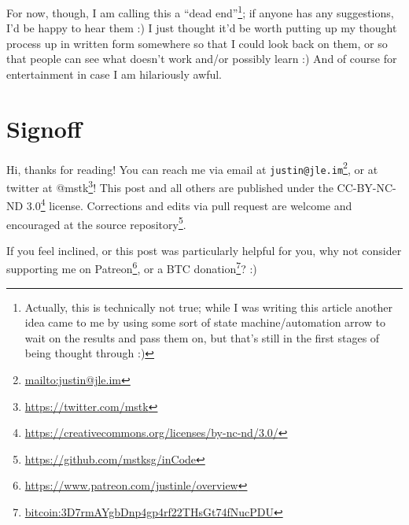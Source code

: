 \documentclass[]{article}
\renewcommand{\href}[2]{#2\footnote{\url{#1}}}
\begin{document}
For now, though, I am calling this a ``dead end''\footnote{Actually, this is
  technically not true; while I was writing this article another idea came to me
  by using some sort of state machine/automation arrow to wait on the results
  and pass them on, but that's still in the first stages of being thought
  through :)}; if anyone has any suggestions, I'd be happy to hear them :) I
just thought it'd be worth putting up my thought process up in written form
somewhere so that I could look back on them, or so that people can see what
doesn't work and/or possibly learn :) And of course for entertainment in case I
am hilariously awful.

\hypertarget{signoff}{%
\section{Signoff}\label{signoff}}

Hi, thanks for reading! You can reach me via email at
\href{mailto:justin@jle.im}{\nolinkurl{justin@jle.im}}, or at twitter at
\href{https://twitter.com/mstk}{@mstk}! This post and all others are published
under the \href{https://creativecommons.org/licenses/by-nc-nd/3.0/}{CC-BY-NC-ND
3.0} license. Corrections and edits via pull request are welcome and encouraged
at \href{https://github.com/mstksg/inCode}{the source repository}.

If you feel inclined, or this post was particularly helpful for you, why not
consider \href{https://www.patreon.com/justinle/overview}{supporting me on
Patreon}, or a \href{bitcoin:3D7rmAYgbDnp4gp4rf22THsGt74fNucPDU}{BTC donation}?
:)
\end{document}
